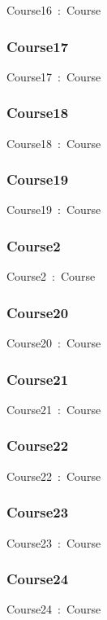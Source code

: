 \documentclass{article}
\begin{document}
Course16~:~Course

\subsubsection*{Course17}

Course17~:~Course

\subsubsection*{Course18}

Course18~:~Course

\subsubsection*{Course19}

Course19~:~Course

\subsubsection*{Course2}

Course2~:~Course

\subsubsection*{Course20}

Course20~:~Course

\subsubsection*{Course21}

Course21~:~Course

\subsubsection*{Course22}

Course22~:~Course

\subsubsection*{Course23}

Course23~:~Course

\subsubsection*{Course24}

Course24~:~Course
\end{document}

